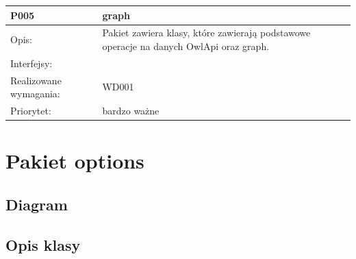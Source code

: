 \documentclass[a4paper,10pt]{article}
\begin{document}
\begin{center}
\begin{longtable}{|m{3cm}|m{9cm}|}
P005 & graph\\ \hline
Opis: & Pakiet zawiera klasy, które zawierają podstawowe operacje na danych OwlApi oraz graph. \\ \hline
Interfejsy: &     \\ \hline
Realizowane wymagania: & WD001 \\ \hline
Priorytet: & bardzo ważne \\ \hline


\end{longtable}

\end{center}

\section{Pakiet options}

\subsection{Diagram}


\subsection{Opis klasy}
\end{document}
